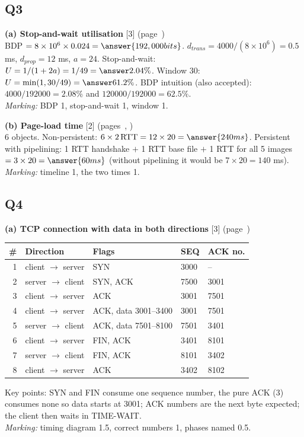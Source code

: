 \subsection*{Q3}
\textbf{(a) Stop-and-wait utilisation} [3] \hfill (page~\pageref{iq:C23})\\
BDP $=8\times10^{6}\times0.024=\answer{192,000 bits}$. $d_{trans}=4000/(8\times10^{6})=0.5$ ms, $d_{prop}=12$ ms, $a=24$. Stop-and-wait: $U=1/(1+2a)=1/49=\answer{2.04\%}$. Window 30: $U=\min(1,30/49)=\answer{61.2\%}$.
BDP intuition (also accepted): $4000/192000=2.08\%$ and $120000/192000=62.5\%$.\\
\textit{Marking:} BDP 1, stop-and-wait 1, window 1.

\textbf{(b) Page-load time} [2] \hfill (pages~\pageref{iq:C11}, \pageref{iq:C12})\\
6 objects. Non-persistent: $6\times2\,\text{RTT}=12\times20=\answer{240 ms}$. Persistent with pipelining: 1 RTT handshake $+$ 1 RTT base file $+$ 1 RTT for all 5 images $=3\times20=\answer{60 ms}$ (without pipelining it would be $7\times20=140$ ms).\\
\textit{Marking:} timeline 1, the two times 1.

\subsection*{Q4}
\textbf{(a) TCP connection with data in both directions} [3] \hfill (page~\pageref{iq:C32})
\begin{center}\small\zebra
\begin{tabular}{rllll}\toprule
\# & Direction & Flags & SEQ & ACK no.\\\midrule
1 & client $\to$ server & SYN & 3000 & --\\
2 & server $\to$ client & SYN, ACK & 7500 & 3001\\
3 & client $\to$ server & ACK & 3001 & 7501\\
4 & client $\to$ server & ACK, data 3001--3400 & 3001 & 7501\\
5 & server $\to$ client & ACK, data 7501--8100 & 7501 & 3401\\
6 & client $\to$ server & FIN, ACK & 3401 & 8101\\
7 & server $\to$ client & FIN, ACK & 8101 & 3402\\
8 & client $\to$ server & ACK & 3402 & 8102\\\bottomrule
\end{tabular}\end{center}
Key points: SYN and FIN consume one sequence number, the pure ACK (3) consumes none so data starts at 3001; ACK numbers are the next byte expected; the client then waits in TIME-WAIT.\\
\textit{Marking:} timing diagram 1.5, correct numbers 1, phases named 0.5.

